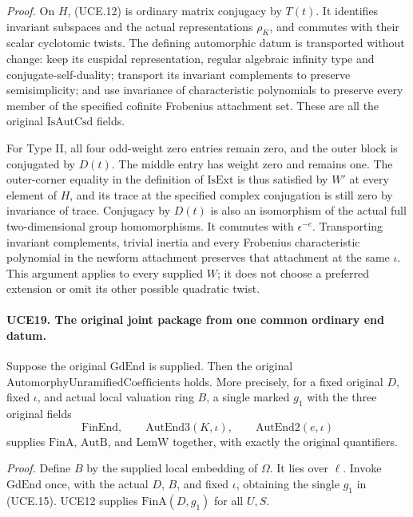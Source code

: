 \documentclass[11pt,a4paper]{article}
\numberwithin{equation}{section}
\theoremstyle{remark}\newtheorem{remark}[theorem]{Remark}
\begin{document}
\emph{Proof.}
On \(H\), (UCE.12) is ordinary matrix conjugacy by \(T(t)\).
It identifies invariant subspaces and the actual representations
\(\rho_K\), and commutes with their scalar cyclotomic twists.
The defining automorphic datum is transported without change:
keep its cuspidal representation, regular algebraic infinity type
and conjugate-self-duality; transport its invariant complements
to preserve semisimplicity; and use invariance of characteristic
polynomials to preserve every member of the specified cofinite
Frobenius attachment set.  These are all the original
\(\mathrm{IsAutCsd}\) fields.

For Type II, all four odd-weight zero entries remain zero, and
the outer block is conjugated by \(D(t)\).  The middle entry
has weight zero and remains one.  The outer-corner equality in
the definition of \(\mathrm{IsExt}\) is thus satisfied by
\(W'\) at every element of \(H\), and its trace at the
specified complex conjugation is still zero by invariance of trace.
Conjugacy by \(D(t)\) is also an isomorphism of the actual full
two-dimensional group homomorphisms.  It commutes with
\(\epsilon^{-e}\).  Transporting invariant complements,
trivial inertia and every Frobenius characteristic polynomial
in the newform attachment preserves that attachment at the same
\(\iota\).  This argument applies to every supplied \(W\);
it does not choose a preferred extension or omit its other possible
quadratic twist.

\paragraph{UCE19. The original joint package from one common ordinary end datum.}
\label{claim:UCE19}
Suppose the original \(\mathrm{GdEnd}\) is supplied.  Then the
original \(\mathrm{AutomorphyUnramifiedCoefficients}\) holds.
More precisely, for a fixed original \(D\), fixed \(\iota\),
and actual local valuation ring \(B\), a single marked \(g_1\)
with the three original fields
\[
        \mathrm{FinEnd},\qquad
        \mathrm{AutEnd3}(K,\iota),\qquad
        \mathrm{AutEnd2}(e,\iota)
 \tag{UCE.15}
\]
supplies \(\mathrm{FinA}\), \(\mathrm{AutB}\), and
\(\mathrm{LemW}\) together, with exactly the original quantifiers.

\emph{Proof.}
Define \(B\) by the supplied local embedding of \(\Omega\).
It lies over \(\ell\).  Invoke \(\mathrm{GdEnd}\) once, with
the actual \(D\), \(B\), and fixed \(\iota\), obtaining the
single \(g_1\) in (UCE.15).  UCE12 supplies
\(\mathrm{FinA}(D,g_1)\) for all \(U,S\).
\end{document}
